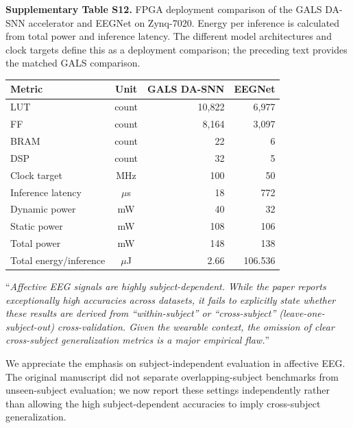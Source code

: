 \documentclass[12pt,technote,onecolumn]{IEEEtran}
\newcommand{\ResponseTableFormat}{%
  \footnotesize
  \renewcommand{\arraystretch}{1.2}%
  \setlength{\tabcolsep}{4pt}%
}
\begin{document}
\noindent\begin{minipage}{\linewidth}
\smallskip\noindent\textbf{Supplementary Table S12.} FPGA deployment comparison of the GALS DA-SNN accelerator and EEGNet on Zynq-7020. Energy per inference is calculated from total power and inference latency. The different model architectures and clock targets define this as a deployment comparison; the preceding text provides the matched GALS comparison.
\begin{center}
\ResponseTableFormat
\begin{tabular*}{\linewidth}{@{\extracolsep{\fill}}lcrr@{}}
\toprule
Metric & Unit & GALS DA-SNN & EEGNet \\
\midrule
LUT & count & 10,822 & 6,977 \\
FF & count & 8,164 & 3,097 \\
BRAM & count & 22 & 6 \\
DSP & count & 32 & 5 \\
Clock target & MHz & 100 & 50 \\
Inference latency & $\mu$s & 18 & 772 \\
Dynamic power & mW & 40 & 32 \\
Static power & mW & 108 & 106 \\
Total power & mW & 148 & 138 \\
Total energy/inference & $\mu$J & 2.66 & 106.536 \\
\bottomrule
\end{tabular*}
\end{center}
\end{minipage}\par\medskip
\vspace{4mm}

``{\it Affective EEG signals are highly subject-dependent. While the paper
reports exceptionally high accuracies across datasets, it fails to
explicitly state whether these results are derived from
``within-subject'' or ``cross-subject'' (leave-one-subject-out)
cross-validation. Given the wearable context, the omission of clear
cross-subject generalization metrics is a major empirical flaw.}''
\vspace{1mm}


We appreciate the emphasis on subject-independent evaluation in affective EEG. The original manuscript did not separate overlapping-subject benchmarks from unseen-subject evaluation; we now report these settings independently rather than allowing the high subject-dependent accuracies to imply cross-subject generalization.
\end{document}
